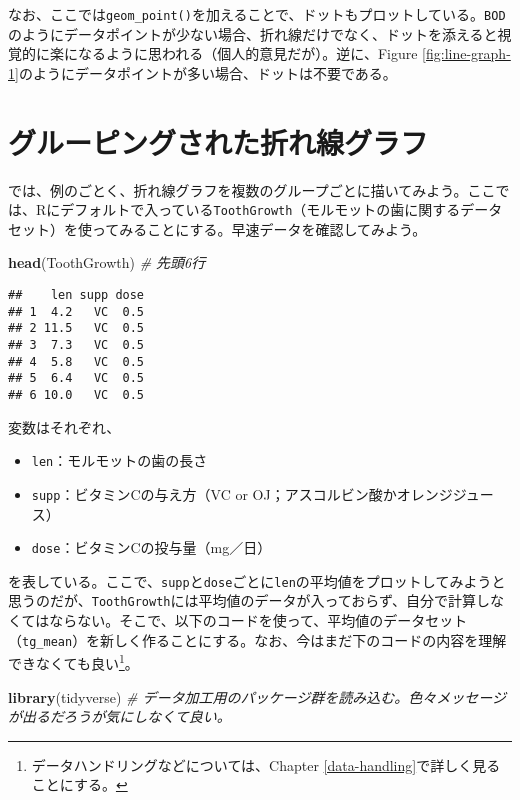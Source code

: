 \documentclass[]{book}
\newenvironment{Shaded}{\begin{snugshade}}{\end{snugshade}}
\newcommand{\KeywordTok}[1]{\textcolor[rgb]{0.13,0.29,0.53}{\textbf{#1}}}
\newcommand{\CommentTok}[1]{\textcolor[rgb]{0.56,0.35,0.01}{\textit{#1}}}
\newcommand{\NormalTok}[1]{#1}
\let\rmarkdownfootnote\footnote%
\def\footnote{\protect\rmarkdownfootnote}
\begin{document}
なお、ここでは\texttt{geom\_point()}を加えることで、ドットもプロットしている。\texttt{BOD}のようにデータポイントが少ない場合、折れ線だけでなく、ドットを添えると視覚的に楽になるように思われる（個人的意見だが）。逆に、Figure
\ref{fig:line-graph-1}のようにデータポイントが多い場合、ドットは不要である。

\section{グルーピングされた折れ線グラフ}

では、例のごとく、折れ線グラフを複数のグループごとに描いてみよう。ここでは、Rにデフォルトで入っている\texttt{ToothGrowth}（モルモットの歯に関するデータセット）を使ってみることにする。早速データを確認してみよう。

\begin{Shaded}
\begin{Highlighting}[]
\KeywordTok{head}\NormalTok{(ToothGrowth) }\CommentTok{# 先頭6行}
\end{Highlighting}
\end{Shaded}

\begin{verbatim}
##    len supp dose
## 1  4.2   VC  0.5
## 2 11.5   VC  0.5
## 3  7.3   VC  0.5
## 4  5.8   VC  0.5
## 5  6.4   VC  0.5
## 6 10.0   VC  0.5
\end{verbatim}

変数はそれぞれ、

\begin{itemize}
\item
  \texttt{len}：モルモットの歯の長さ
\item
  \texttt{supp}：ビタミンCの与え方（VC or
  OJ；アスコルビン酸かオレンジジュース）
\item
  \texttt{dose}：ビタミンCの投与量（mg／日）
\end{itemize}

を表している。ここで、\texttt{supp}と\texttt{dose}ごとに\texttt{len}の平均値をプロットしてみようと思うのだが、\texttt{ToothGrowth}には平均値のデータが入っておらず、自分で計算しなくてはならない。そこで、以下のコードを使って、平均値のデータセット（\texttt{tg\_mean}）を新しく作ることにする。なお、今はまだ下のコードの内容を理解できなくても良い\footnote{データハンドリングなどについては、Chapter
  \ref{data-handling}で詳しく見ることにする。}。

\begin{Shaded}
\begin{Highlighting}[]
\KeywordTok{library}\NormalTok{(tidyverse) }\CommentTok{# データ加工用のパッケージ群を読み込む。色々メッセージが出るだろうが気にしなくて良い。}
\end{Highlighting}
\end{Shaded}
\end{document}
